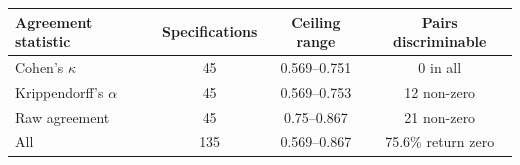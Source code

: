\begin{tabular}{lccc}
\toprule
Agreement statistic & Specifications & Ceiling range & Pairs discriminable \\
\midrule
Cohen's $\kappa$ & 45 & 0.569--0.751 & 0 in all \\
Krippendorff's $\alpha$ & 45 & 0.569--0.753 & 12 non-zero \\
Raw agreement & 45 & 0.75--0.867 & 21 non-zero \\
\midrule
All & 135 & 0.569--0.867 & 75.6\% return zero \\
\bottomrule
\end{tabular}
